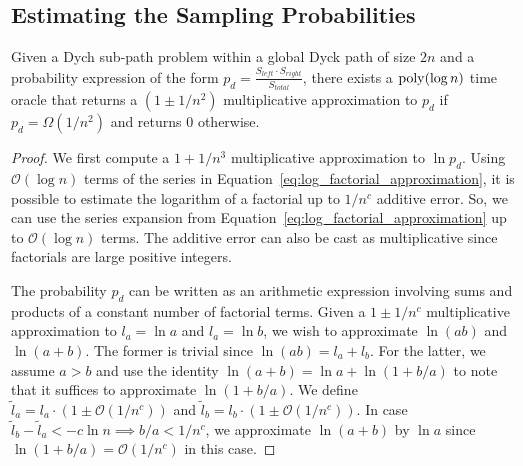 \subsection{Estimating the Sampling Probabilities}%
\label{sec:computing_probabilities}
\begin{lemma}
\label{lem:probability_approximation_oracle}
Given a Dych sub-path problem within a global Dyck path of size $2n$ and a probability expression of the form
$p_d = \frac{S_{left}\cdot S_{right}}{S_{total}}$, there exists a $\mathrm{poly}(\log n)$ time oracle that returns a
$\left( 1\pm 1/n^2\right)$ multiplicative approximation to $p_d$ if $p_d = \Omega(1/n^2)$ and returns $0$ otherwise.
\end{lemma}
\begin{proof}
We first compute a $1+1/n^3$ multiplicative approximation to $\ln p_d$.
Using $\mathcal O(\log n)$ terms of the series in Equation~\ref{eq:log_factorial_approximation},
it is possible to estimate the logarithm of a factorial up to $1/n^c$ additive error.
So, we can use the series expansion from Equation~\ref{eq:log_factorial_approximation} up to $\mathcal O(\log n)$ terms.
The additive error can also be cast as multiplicative since factorials are large positive integers.

The probability $p_d$ can be written as an arithmetic expression involving sums and products of a constant number of factorial terms.
Given a $1\pm1/n^c$ multiplicative approximation to $l_a = \ln a$ and $l_a = \ln b$, we wish to approximate $\ln(ab)$ and $\ln(a+b)$.
The former is trivial since $\ln(ab) = l_a + l_b$.
For the latter, we assume $a>b$ and use the identity $\ln(a+b) = \ln a + \ln(1+b/a)$ to note that it suffices to approximate $\ln(1+b/a)$.
We define $\widetilde l_a = l_a\cdot(1\pm \mathcal O(1/n^c))$ and $\widetilde l_b = l_b\cdot(1\pm \mathcal O(1/n^c))$.
In case $\widetilde l_b-\widetilde l_a < -c\ln n\implies b/a < 1/n^c$,
we approximate $\ln(a+b)$ by $\ln a$ since $\ln(1+b/a) = \mathcal O(1/n^c)$ in this case.


\end{proof}

